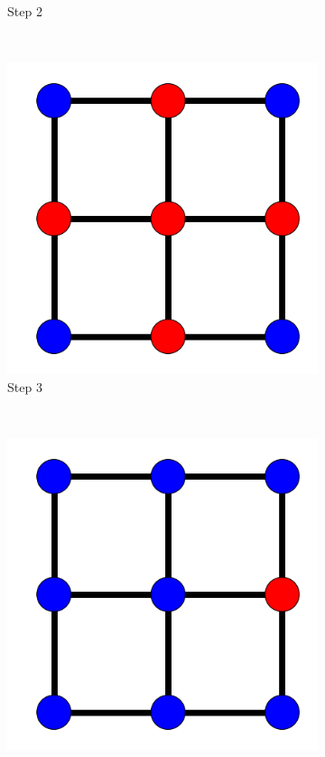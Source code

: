\documentclass[bsc,frontabs,twoside,singlespacing,parskip,deptreport]{infthesis}     %
\begin{document}
\begin{figure}
\begin{subfigure}[b]{0.18\textwidth}
        \caption{Step 2}
        \label{fig:simpleProcess2}
    \end{subfigure}
    ~ %
    

    \begin{subfigure}[b]{0.18\textwidth}
        \includegraphics[width=\textwidth]{simpleProcess3}
        \caption{Step 3}
        \label{fig:simpleProcess3}
    \end{subfigure}
    ~ %
    \begin{subfigure}[b]{0.18\textwidth}
        \includegraphics[width=\textwidth]{simpleProcess4}

\end{subfigure}
\end{figure}
\end{document}
